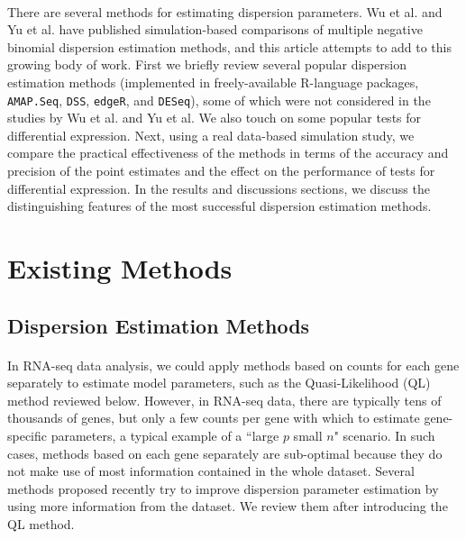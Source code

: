 \documentclass[10pt]{article}
\begin{document}
\paragraph{} \indent There are several methods for estimating dispersion parameters. Wu et al. \cite{dss} and Yu et al. \cite{yu} have published simulation-based comparisons of multiple negative binomial dispersion estimation methods, and this article attempts to add to this growing body of work. First we briefly review several popular dispersion estimation methods (implemented in freely-available R-language packages, {\tt AMAP.Seq}, {\tt DSS}, {\tt edgeR}, and {\tt DESeq}), some of which were not considered in the studies by Wu et al. and Yu et al. We also touch on some popular tests for differential expression. Next, using a real data-based simulation study, we compare the practical effectiveness of the methods in terms of the accuracy and precision of the point estimates and the effect on the performance of tests for differential expression. In the results and discussions sections, we discuss the distinguishing features of the most successful dispersion estimation methods.

\section*{Existing Methods}

\subsection*{Dispersion Estimation Methods} \label{sec:disp}

\paragraph{} \indent In RNA-seq data analysis, we could apply methods based on counts for each gene separately to estimate model parameters, such as the Quasi-Likelihood (QL) method reviewed below. However,
in RNA-seq data, there are typically tens of thousands of genes, but only a few counts per gene with which to estimate gene-specific parameters, a typical example of a ``large $p$ small $n$" scenario. In such cases, methods based on each gene separately are sub-optimal because they do not make use of most information contained in the whole dataset. Several methods proposed recently try to improve  dispersion parameter estimation by using more information from the dataset. We review them after introducing the QL method.
\end{document}
